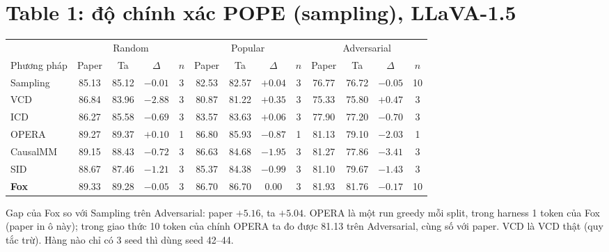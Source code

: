\documentclass[10pt,a4paper]{article}
\begin{document}
\section{Table 1: độ chính xác POPE (sampling), LLaVA-1.5}
\begin{center}\small
\begin{tabular}{@{}l *{3}{cccc}@{}}
\toprule
& \multicolumn{4}{c}{Random} & \multicolumn{4}{c}{Popular} & \multicolumn{4}{c}{Adversarial} \\
\cmidrule(lr){2-5}\cmidrule(lr){6-9}\cmidrule(lr){10-13}
Phương pháp & Paper & Ta & $\Delta$ & $n$ & Paper & Ta & $\Delta$ & $n$ & Paper & Ta & $\Delta$ & $n$ \\
\midrule
Sampling & 85.13 & 85.12 & $-0.01$ & 3 & 82.53 & 82.57 & $+0.04$ & 3 & 76.77 & 76.72 & $-0.05$ & 10 \\
VCD & 86.84 & 83.96 & $-2.88$ & 3 & 80.87 & 81.22 & $+0.35$ & 3 & 75.33 & 75.80 & $+0.47$ & 3 \\
ICD & 86.27 & 85.58 & $-0.69$ & 3 & 83.57 & 83.63 & $+0.06$ & 3 & 77.90 & 77.20 & $-0.70$ & 3 \\
OPERA & 89.27 & 89.37 & $+0.10$ & 1 & 86.80 & 85.93 & $-0.87$ & 1 & 81.13 & 79.10 & $-2.03$ & 1 \\
CausalMM & 89.15 & 88.43 & $-0.72$ & 3 & 86.63 & 84.68 & $-1.95$ & 3 & 81.27 & 77.86 & $-3.41$ & 3 \\
SID & 88.67 & 87.46 & $-1.21$ & 3 & 85.37 & 84.38 & $-0.99$ & 3 & 81.10 & 79.67 & $-1.43$ & 3 \\
\textbf{Fox} & 89.33 & 89.28 & $-0.05$ & 3 & 86.70 & 86.70 & $0.00$ & 3 & 81.93 & 81.76 & $-0.17$ & 10 \\
\bottomrule
\end{tabular}
\end{center}
\noindent\small Gap của Fox so với Sampling trên Adversarial: paper $+5.16$, ta $+5.04$. OPERA là một run greedy mỗi split, trong harness 1 token của Fox (paper in ô này); trong giao thức 10 token của chính OPERA ta đo được 81.13 trên Adversarial, cùng số với paper. VCD là VCD thật (quy tắc trừ). Hàng nào chỉ có 3 seed thì dùng seed 42--44.
\end{document}
